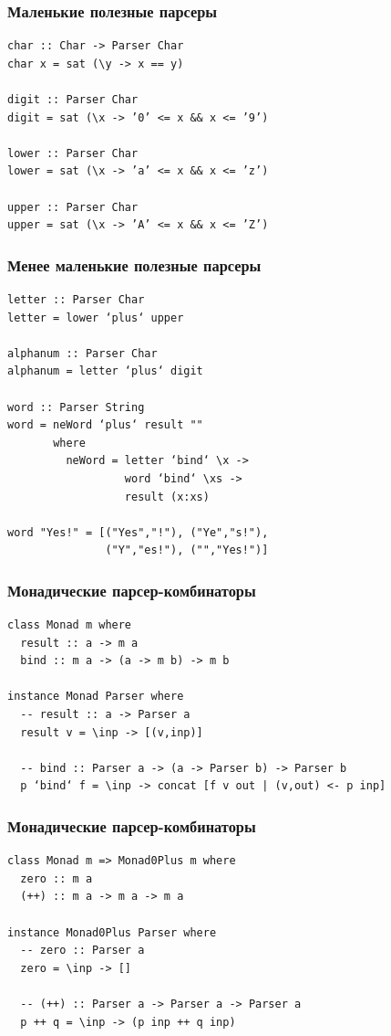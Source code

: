 \documentclass{beamer}
\begin{document}
\begin{frame}[fragile]
  \transwipe[direction=90]
  \frametitle{Маленькие полезные парсеры}
\begin{verbatim}
char :: Char -> Parser Char
char x = sat (\y -> x == y)

digit :: Parser Char
digit = sat (\x -> ’0’ <= x && x <= ’9’)

lower :: Parser Char
lower = sat (\x -> ’a’ <= x && x <= ’z’)

upper :: Parser Char
upper = sat (\x -> ’A’ <= x && x <= ’Z’)
\end{verbatim}
\end{frame}

\begin{frame}[fragile]
  \transwipe[direction=90]
  \frametitle{Менее маленькие полезные парсеры}
\begin{verbatim}
letter :: Parser Char
letter = lower ‘plus‘ upper

alphanum :: Parser Char
alphanum = letter ‘plus‘ digit

word :: Parser String
word = neWord ‘plus‘ result ""
       where
         neWord = letter ‘bind‘ \x ->
                  word ‘bind‘ \xs ->
                  result (x:xs)

word "Yes!" = [("Yes","!"), ("Ye","s!"), 
               ("Y","es!"), ("","Yes!")]
\end{verbatim}
\end{frame}

\begin{frame}[fragile]
  \transwipe[direction=90]
  \frametitle{Монадические парсер-комбинаторы}
\begin{verbatim}
class Monad m where
  result :: a -> m a
  bind :: m a -> (a -> m b) -> m b

instance Monad Parser where
  -- result :: a -> Parser a
  result v = \inp -> [(v,inp)]

  -- bind :: Parser a -> (a -> Parser b) -> Parser b
  p ‘bind‘ f = \inp -> concat [f v out | (v,out) <- p inp]
\end{verbatim}
\end{frame}

\begin{frame}[fragile]
  \transwipe[direction=90]
  \frametitle{Монадические парсер-комбинаторы}
\begin{verbatim}
class Monad m => Monad0Plus m where
  zero :: m a
  (++) :: m a -> m a -> m a

instance Monad0Plus Parser where
  -- zero :: Parser a
  zero = \inp -> []
  
  -- (++) :: Parser a -> Parser a -> Parser a
  p ++ q = \inp -> (p inp ++ q inp)
\end{verbatim}
\end{frame}
\end{document}
